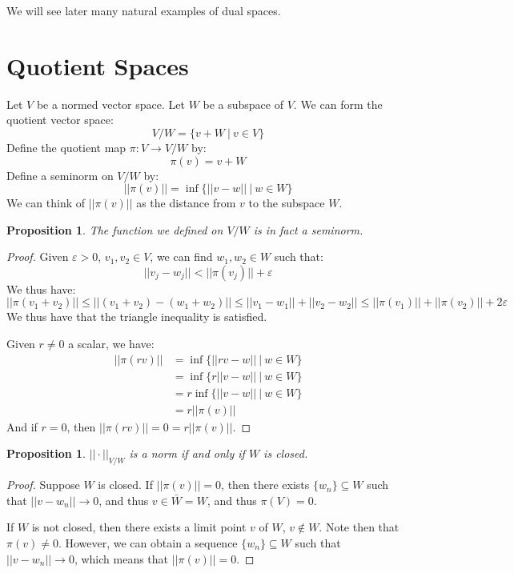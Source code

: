 \documentclass[a4paper,12pt]{report}
\newcommand{\varep}{ \varepsilon }
\newcommand{\sse} {\subseteq}
\newtheorem{prop}[theorem]{Proposition}
\begin{document}
	\noindent We will see later many natural examples of dual spaces.
	
	\section{Quotient Spaces}
	
	Let $V$ be a normed vector space. Let $W$ be a subspace of $V$. We can form the quotient vector space:
	\[ V / W = \{v + W ~|~ v \in V \} \]
	Define the quotient map $\pi : V \rightarrow V / W$ by:
	\[ \pi(v) = v + W \]
	Define a seminorm on $V / W$ by:
	\[ ||\pi(v)|| = \inf \bigg\{ ||v - w|| ~\big|~ w \in W \bigg\} \]
	We can think of $||\pi(v)||$ as the distance from $v$ to the subspace $W$. 
	
	\begin{prop}
	The function we defined on $V / W$ is in fact a seminorm. 
	\end{prop}
	\begin{proof}
	Given $\varep > 0$, $v_1, v_2 \in V$, we can find $w_1, w_2 \in W$ such that:
	\[ ||v_j - w_j|| < ||\pi(v_j)|| + \varep \]
	We thus have:
	\[ ||\pi(v_1 + v_2)|| \leq ||(v_1 + v_2) - (w_1 + w_2)|| \leq ||v_1 - w_1|| + ||v_2 - w_2|| \leq ||\pi(v_1)|| + ||\pi(v_2)|| + 2\varep \]
	We thus have that the triangle inequality is satisfied.
	
	Given $r \neq 0$ a scalar, we have:
	\begin{align*}
	||\pi(rv)|| &= \inf \bigg\{ ||rv - w|| ~\big|~ w \in W \bigg\} \\
	&= \inf \bigg\{ r ||v - w|| ~\big|~ w \in W \bigg\} \\
	&= r \inf \bigg\{ ||v - w|| ~\big|~ w \in W \bigg\} \\
	&= r ||\pi(v)||
	\end{align*}
	And if $r = 0$, then $||\pi(rv)|| = 0 = r ||\pi(v)||$. 
	\end{proof}
	
	\begin{prop}
	$||\cdot||_{V / W}$ is a norm if and only if $W$ is closed.
	\end{prop}
	\begin{proof}
	Suppose $W$ is closed. If $||\pi(v)|| = 0$, then there exists $\{w_n\} \sse W$ such that $||v - w_n|| \rightarrow 0$, and thus $v \in \bar{W} = W$, and thus $\pi(V) = 0$. 
	
	If $W$ is not closed, then there exists a limit point $v$ of $W$, $v \notin W$. Note then that $\pi(v) \neq 0$. However, we can obtain a sequence $\{w_n\} \sse W$ such that $||v - w_n|| \rightarrow 0$, which means that $||\pi(v)|| = 0$. 
	\end{proof}
	
\end{document}

